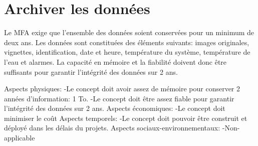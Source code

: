 

\section{Archiver les données}
\label{s:faisab_archiver}
Le MFA exige que l’ensemble des données soient conservées pour un minimum de deux ans. Les données sont constituées des éléments suivants: images originales, vignettes, identification, date et heure, température du système, température de l’eau et alarmes. La capacité en mémoire et la fiabilité doivent donc être suffisants pour garantir l’intégrité des données sur 2 ans.

Aspects physiques:
-Le concept doit avoir assez de mémoire pour conserver 2 années d'information: 1 To.
-Le concept doit être assez fiable pour garantir l’intégrité des données sur 2 ans.
Aspects économiques:
-Le concept doit minimiser le coût 
Aspects temporels:
-Le concept doit pouvoir être construit et déployé dans les délais du projets.
Aspects sociaux-environnementaux:
-Non-applicable







